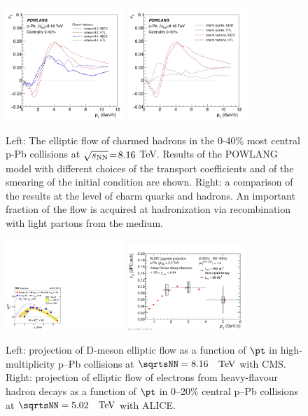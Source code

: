\begin{figure}[ht]
\centering
\includegraphics[width=0.4\textwidth]{hf/figures/v2cD_pPb8TeV_smear.png}
\includegraphics[width=0.4\textwidth]{hf/figures/v2cD_pPb8TeV_HTLvslQCD.png}
\caption{
Left: The elliptic flow of charmed hadrons in the 0-40\% most central p-Pb collisions at $\sqrt{s_{\rm NN}}\!=\!8.16$ TeV. Results of the POWLANG model with different choices of the transport coefficients and of the smearing of the initial condition are shown. 
Right: a comparison of the results at the level of charm quarks and hadrons. An important fraction of the flow is acquired at hadronization via recombination with light partons from the medium.}
\label{fig:POWLANG-small2}
\end{figure}
\begin{figure}[ht]
\centering
\includegraphics[width=0.4\textwidth]{hf/figures/CMS_Dv2.pdf}
\includegraphics[width=0.4\textwidth]{hf/figures/2017-Oct-30-HFev2Plot.pdf}
\caption{
Left: projection of D-meson elliptic flow as a function of $\pt$ in high-multiplicity p--Pb collisions at $\sqrtsNN=8.16$~$~\text{TeV}$ with CMS.
Right: projection of elliptic flow of electrons from heavy-flavour hadron decays as a function of $\pt$ in 0--20\% central p--Pb collisions at $\sqrtsNN=5.02$~$~\text{TeV}$ with ALICE.}
\label{fig:elliptic-data}
\end{figure}

